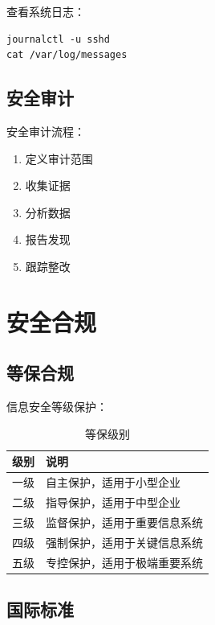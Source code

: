 \documentclass[12pt,UTF8]{ctexbook}
\begin{document}
查看系统日志：
\begin{verbatim}
journalctl -u sshd
cat /var/log/messages
\end{verbatim}

\section{安全审计}
\label{sec:security_audit}

安全审计流程：
\begin{enumerate}
    \item 定义审计范围
    \item 收集证据
    \item 分析数据
    \item 报告发现
    \item 跟踪整改
\end{enumerate}

\chapter{安全合规}
\label{chap:compliance}

\section{等保合规}
\label{sec:cybersecurity_grade}

信息安全等级保护：
\begin{table}[htbp]
    \centering
    \caption{等保级别}
    \begin{tabular}{|c|p{8cm}|}
        \hline
        \textbf{级别} & \textbf{说明} \\
        \hline
        一级 & 自主保护，适用于小型企业 \\
        \hline
        二级 & 指导保护，适用于中型企业 \\
        \hline
        三级 & 监督保护，适用于重要信息系统 \\
        \hline
        四级 & 强制保护，适用于关键信息系统 \\
        \hline
        五级 & 专控保护，适用于极端重要系统 \\
        \hline
    \end{tabular}
\end{table}

\section{国际标准}
\label{sec:international_standards}
\end{document}
